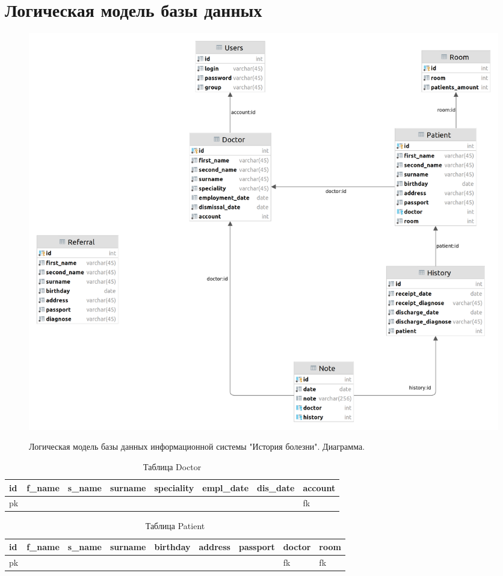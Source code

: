 \documentclass[12pt, a4paper]{article}
\begin{document}
    \newpage
    \section{Логическая модель базы данных}
    \begin{figure}[ht!]
    	\centering    %
    	\includegraphics[width=1\textwidth]{pictures/logic_model.png}
    	\label{fig:pic13} %
    	\caption{Логическая модель базы данных информационной системы "История болезни". Диаграмма.}
    \end{figure}
    
    \begin{table}[hb!]
    	\caption{Таблица Doctor}
    	\begin{center}
        	\begin{tabular}{ | l | l | l | l | l | l | l | l | }
        		\hline
        		\textbf{id} & f\_name & s\_name & surname & speciality & empl\_date & dis\_date & account \\ \hline 
        		pk & & & & & & & fk
        	\end{tabular}
        \end{center}
    \end{table}

    \begin{table}[hb!]
    	\caption{Таблица Patient}
    	\begin{center}
        	\begin{tabular}{ | l | l | l | l | l | l | l | l |l | }
        		\hline
        		\textbf{id} & f\_name & s\_name & surname & birthday & address & passport & doctor & room \\ \hline 
        		pk & & & & & & & fk & fk
        	\end{tabular}
        \end{center}
    \end{table}
\end{document}
